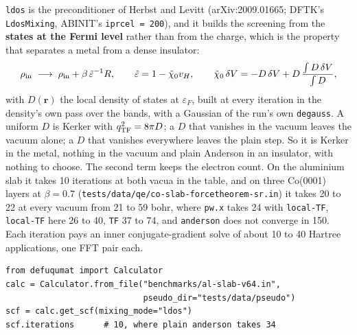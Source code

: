 \documentclass[11pt,a4paper]{article}
\newcommand{\code}[1]{\texttt{\small #1}}
\begin{document}
\code{ldos} is the preconditioner of Herbst and Levitt (arXiv:2009.01665; DFTK's
\code{LdosMixing}, ABINIT's \code{iprcel = 200}), and it builds the screening from the
\textbf{states at the Fermi level} rather than from the charge, which is the property
that separates a metal from a dense insulator:
\begin{equation*}
  \rho_{\rm in} \;\longrightarrow\; \rho_{\rm in} + \beta\,\tilde\varepsilon^{-1} R,
  \qquad
  \tilde\varepsilon = 1 - \tilde\chi_0 v_H,
  \qquad
  \tilde\chi_0\,\delta V = -D\,\delta V + D\,\frac{\int D\,\delta V}{\int D},
\end{equation*}
with $D(\mathbf r)$ the local density of states at $\varepsilon_F$, built at every
iteration in the density's own pass over the bands, with a Gaussian of the run's own
\code{degauss}. A uniform $D$ is Kerker with $q_{\rm TF}^2 = 8\pi D$; a $D$ that vanishes
in the vacuum leaves the vacuum alone; a $D$ that vanishes everywhere leaves the plain
step. So it is Kerker in the metal, nothing in the vacuum and plain Anderson in an
insulator, with nothing to choose. The second term keeps the electron count. On the
aluminium slab it takes 10 iterations at both vacua in the table, and on three Co(0001)
layers at $\beta = 0.7$ (\code{tests/data/qe/co-slab-forcetheorem-sr.in}) it takes 20
to 22 at every vacuum from 21 to 59 bohr, where \code{pw.x} takes 24 with \code{local-TF},
\code{local-TF} here 26 to 40, \code{TF} 37 to 74, and \code{anderson} does not converge
in 150. Each iteration pays an inner conjugate-gradient solve of about 10 to 40 Hartree
applications, one FFT pair each.
\begin{verbatim}
from defuqumat import Calculator
calc = Calculator.from_file("benchmarks/al-slab-v64.in",
                            pseudo_dir="tests/data/pseudo")
scf = calc.get_scf(mixing_mode="ldos")
scf.iterations      # 10, where plain anderson takes 34
\end{verbatim}
\end{document}
